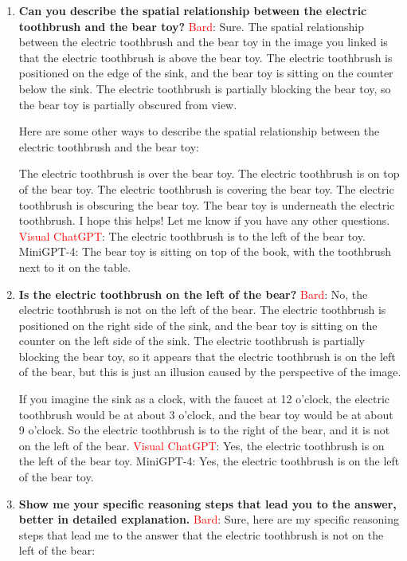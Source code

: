     \begin{enumerate}
        \item \textbf{Can you describe the spatial relationship between the electric toothbrush and the bear toy?}
        \subitem \textcolor{Red}{Bard}: Sure. The spatial relationship between the electric toothbrush and the bear toy in the image you linked is that the electric toothbrush is above the bear toy. The electric toothbrush is positioned on the edge of the sink, and the bear toy is sitting on the counter below the sink. The electric toothbrush is partially blocking the bear toy, so the bear toy is partially obscured from view.

        Here are some other ways to describe the spatial relationship between the electric toothbrush and the bear toy:
        
        The electric toothbrush is over the bear toy.
        The electric toothbrush is on top of the bear toy.
        The electric toothbrush is covering the bear toy.
        The electric toothbrush is obscuring the bear toy.
        The bear toy is underneath the electric toothbrush.
        I hope this helps! Let me know if you have any other questions.
        \subitem \textcolor{red}{Visual ChatGPT}: The electric toothbrush is to the left of the bear toy.
        \subitem MiniGPT-4: The bear toy is sitting on top of the book, with the toothbrush next to it on the table.
        \item \textbf{Is the electric toothbrush on the left of the bear?}
        \subitem \textcolor{Red}{Bard}: 
        No, the electric toothbrush is not on the left of the bear. The electric toothbrush is positioned on the right side of the sink, and the bear toy is sitting on the counter on the left side of the sink. The electric toothbrush is partially blocking the bear toy, so it appears that the electric toothbrush is on the left of the bear, but this is just an illusion caused by the perspective of the image.
        
        If you imagine the sink as a clock, with the faucet at 12 o'clock, the electric toothbrush would be at about 3 o'clock, and the bear toy would be at about 9 o'clock. So the electric toothbrush is to the right of the bear, and it is not on the left of the bear.
        \subitem \textcolor{red}{Visual ChatGPT}: Yes, the electric toothbrush is on the left of the bear toy.
        \subitem MiniGPT-4: Yes, the electric toothbrush is on the left of the bear toy.
        \item \textbf{Show me your specific reasoning steps that lead you to the answer, better in detailed explanation.}
        \subitem \textcolor{Red}{Bard}: 
        Sure, here are my specific reasoning steps that lead me to the answer that the electric toothbrush is not on the left of the bear:
        

\end{enumerate}
